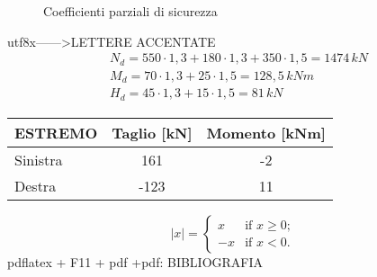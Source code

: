  \begin{figure} [t!]
 \centering
 \hspace{5mm}
    \vspace{5mm}
    \centering
 \caption{Coefficienti parziali di sicurezza} \label{ntc}
 \end{figure}
 utf8x------>LETTERE ACCENTATE
 \begin{equation}
 \begin{split}
 &N_d=550\cdot 1,3+180\cdot 1,3+350 \cdot 1,5=1474\,kN \\
 &M_d=70\cdot 1,3+ 25 \cdot 1,5=128,5\,kNm \\
 &H_d=45 \cdot 1,3+ 15 \cdot 1,5= 81 \,kN
 \end{split}
 \end{equation}
\begin{tabular}{|l|c|c|}
\hline
ESTREMO & Taglio [kN] & Momento [kNm]   \\
\hline
Sinistra       & 161     & -2 \\
\hline
Destra         & -123     & 11  \\
\hline
\end{tabular}
\[ |x| = \left\{ \begin{array}{ll}
         x & \mbox{if $x \geq 0$};\\
        -x & \mbox{if $x < 0$}.\end{array} \right. \] 
pdflatex + F11 + pdf +pdf: BIBLIOGRAFIA
\listoftables
